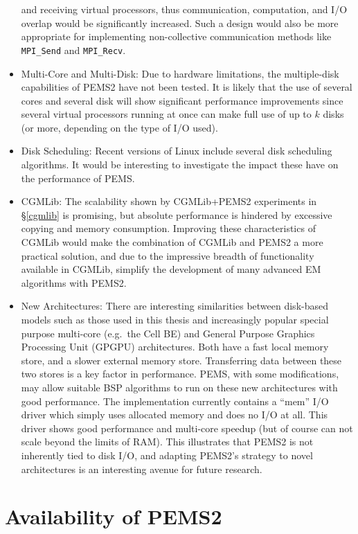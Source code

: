 \documentclass[12pt]{carletoncsthesis}
\begin{document}
\begin{itemize}
and receiving virtual processors, thus communication, computation, and I/O
overlap would be significantly increased.  Such a design would also be more
appropriate for implementing non-collective communication methods like {\tt
MPI\_Send} and {\tt MPI\_Recv}.
\item Multi-Core and Multi-Disk: Due to hardware limitations, the multiple-disk
capabilities of PEMS2 have not been tested.  It is likely that the use of
several cores and several disk will show significant performance improvements
since several virtual processors running at once can make full use of up to
$k$ disks (or more, depending on the type of I/O used).
\item Disk Scheduling: Recent versions of Linux include several disk
scheduling algorithms.  It would be interesting to investigate the impact
these have on the performance of PEMS.
\item CGMLib: The scalability shown by CGMLib+PEMS2 experiments in
\S\ref{cgmlib} is promising, but absolute performance is hindered by excessive
copying and memory consumption.  Improving these characteristics of CGMLib
would make the combination of CGMLib and PEMS2 a more practical solution,
and due to the impressive breadth of functionality available in CGMLib,
simplify the development of many advanced EM algorithms with PEMS2.
\item New Architectures: There are interesting similarities between disk-based
models such as those used in this thesis and increasingly popular special
purpose multi-core (e.g.\ the Cell BE) and General Purpose Graphics Processing
Unit (GPGPU) architectures.  Both have a fast local memory store, and a slower
external memory store.  Transferring data between these two stores is a key
factor in performance.  PEMS, with some modifications, may allow suitable
BSP algorithms to run on these new architectures with good performance.
The implementation currently contains a ``mem'' I/O driver which simply uses
allocated memory and does no I/O at all.  This driver shows good performance
and multi-core speedup (but of course can not scale beyond the limits of RAM).
This illustrates that PEMS2 is not inherently tied to disk I/O, and
adapting PEMS2's strategy to novel architectures is an interesting avenue for
future research.
\end{itemize}






\appendix

\chapter{Availability of PEMS2}
\thispagestyle{empty}
\label{availability}
\end{document}
